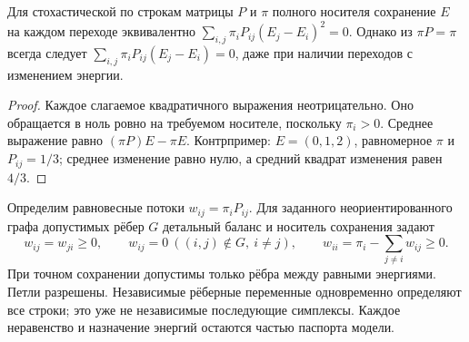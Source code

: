 \begin{proposition}\label{prop:energy}
{Для стохастической по строкам матрицы $P$ и $\pi$ полного носителя сохранение $E$ на каждом переходе эквивалентно $\sum_{i,j}\pi_iP_{ij}(E_j-E_i)^2=0$. Однако из $\pi P=\pi$ всегда следует $\sum_{i,j}\pi_iP_{ij}(E_j-E_i)=0$, даже при наличии переходов с изменением энергии.}
\end{proposition}
\begin{proof}
{Каждое слагаемое квадратичного выражения неотрицательно. Оно обращается в ноль ровно на требуемом носителе, поскольку $\pi_i>0$. Среднее выражение равно $(\pi P)E-\pi E$. Контрпример: $E=(0,1,2)$, равномерное $\pi$ и $P_{ij}=1/3$; среднее изменение равно нулю, а средний квадрат изменения равен $4/3$.}
\end{proof}

{Определим равновесные потоки $w_{ij}=\pi_iP_{ij}$. Для заданного неориентированного графа допустимых рёбер $G$ детальный баланс и носитель сохранения задают}
\begin{equation}\label{eq:flows}
 w_{ij}=w_{ji}\geq0,\qquad
 w_{ij}=0\ ((i,j)\notin G,\ i\ne j),\qquad
 w_{ii}=\pi_i-\sum_{j\ne i}w_{ij}\geq0.
\end{equation}
{При точном сохранении допустимы только рёбра между равными энергиями. Петли разрешены. Независимые рёберные переменные одновременно определяют все строки; это уже не независимые последующие симплексы. Каждое неравенство и назначение энергий остаются частью паспорта модели.}

